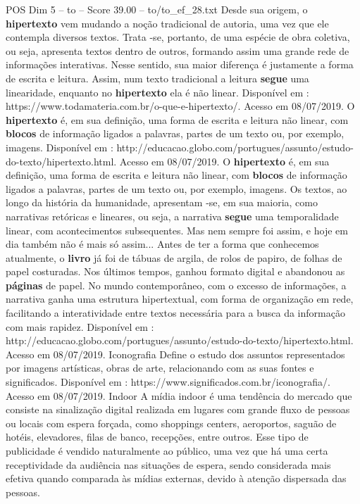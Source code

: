\begin{textsample}{POS Dim 5 – to – Score 39.00 – to/to\_ef\_28.txt}
Desde sua origem, o \textbf{hipertexto} vem mudando a noção tradicional de autoria, uma vez que ele contempla diversos textos.
Trata -se, portanto, de uma espécie de obra coletiva, ou seja, apresenta textos dentro de outros, formando assim uma grande rede de informações interativas.
Nesse sentido, sua maior diferença é justamente a forma de escrita e leitura.
Assim, num texto tradicional a leitura \textbf{segue} uma linearidade, enquanto no \textbf{hipertexto} ela é não linear.
Disponível em : https://www.todamateria.com.br/o-que-e-hipertexto/.
Acesso em 08/07/2019.
O \textbf{hipertexto} é, em sua definição, uma forma de escrita e leitura não linear, com \textbf{blocos} de informação ligados a palavras, partes de um texto ou, por exemplo, imagens.
Disponível em : http://educacao.globo.com/portugues/assunto/estudo-do-texto/hipertexto.html.
Acesso em 08/07/2019.
O \textbf{hipertexto} é, em sua definição, uma forma de escrita e leitura não linear, com \textbf{blocos} de informação ligados a palavras, partes de um texto ou, por exemplo, imagens.
Os textos, ao longo da história da humanidade, apresentam -se, em sua maioria, como narrativas retóricas e lineares, ou seja, a narrativa \textbf{segue} uma temporalidade linear, com acontecimentos subsequentes.
Mas nem sempre foi assim, e hoje em dia também não é mais só assim...
Antes de ter a forma que conhecemos atualmente, o \textbf{livro} já foi de tábuas de argila, de rolos de papiro, de folhas de papel costuradas.
Nos últimos tempos, ganhou formato digital e abandonou as \textbf{páginas} de papel.
No mundo contemporâneo, com o excesso de informações, a narrativa ganha uma estrutura hipertextual, com forma de organização em rede, facilitando a interatividade entre textos necessária para a busca da informação com mais rapidez.
Disponível em : http://educacao.globo.com/portugues/assunto/estudo-do-texto/hipertexto.html.
Acesso em 08/07/2019.
Iconografia Define o estudo dos assuntos representados por imagens artísticas, obras de arte, relacionando com as suas fontes e significados.
Disponível em : https://www.significados.com.br/iconografia/.
Acesso em 08/07/2019.
Indoor A mídia indoor é uma tendência do mercado que consiste na sinalização digital realizada em lugares com grande fluxo de pessoas ou locais com espera forçada, como shoppings centers, aeroportos, saguão de hotéis, elevadores, filas de banco, recepções, entre outros.
Esse tipo de publicidade é vendido naturalmente ao público, uma vez que há uma certa receptividade da audiência nas situações de espera, sendo considerada mais efetiva quando comparada às mídias externas, devido à atenção dispersada das pessoas.

\end{textsample}
